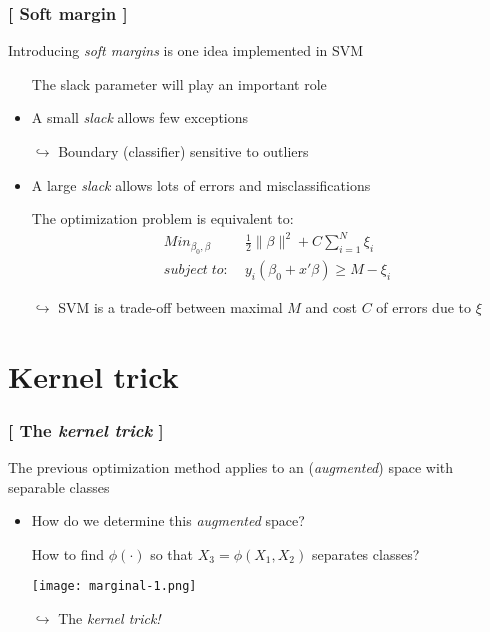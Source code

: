 \documentclass[xcolor=x11names,compress]{beamer}
\renewcommand{\(}{\begin{columns}}
\renewcommand{\)}{\end{columns}}
\newcommand{\<}[1]{\begin{column}{#1}}
\renewcommand{\>}{\end{column}}
\begin{document}
\begin{frame}
\frametitle{\textcolor{brique}{[ Soft margin ]}}
Introducing \textit{soft margins} is one idea implemented in SVM
\pause
\begin{itemize}[<+->]
    \item[] The slack parameter will play an important role
    \item A small \textit{slack} allows few exceptions
    \item[$\hookrightarrow$] Boundary (classifier) sensitive to outliers
    \item A large \textit{slack} allows lots of errors and misclassifications
    \item[] The optimization problem  is equivalent to:
    \begin{eqnarray}
                & Min_{\beta_0, \beta} &  \frac{1}{2} \| \beta \|^2 + C \sum_{i=1}^N \xi_i  \\
        \nonumber       & subject\; to:\; &  y_i(\beta_0 +x'\beta) \geq  M - \xi_i
    \end{eqnarray}
    \item[$\hookrightarrow$] SVM is a trade-off between maximal $M$ and cost $C$ of errors due to $\xi$
\end{itemize}
\end{frame}


\section{Kernel trick}


\begin{frame}
\frametitle{\textcolor{brique}{[ The \textit{kernel trick} ]}}
The previous optimization method applies to an (\textit{augmented}) space with separable classes
\pause
\begin{itemize}[<+->]
    \item How do we determine this \textit{augmented} space?
    \item[] How to find $\phi(\cdot)$ so that $X_3 = \phi(X_1, X_2)$  separates classes?
    \item[] \texttt{[image: marginal-1.png]}
    \item[$\hookrightarrow$] The \emph{kernel trick!}
\end{itemize}
\end{frame}
\end{document}
